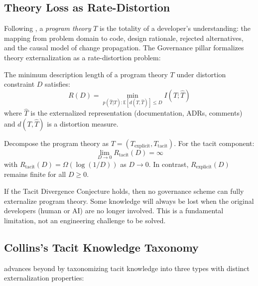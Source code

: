 \subsection{Theory Loss as Rate-Distortion}

Following \citet{naur1985}, a \emph{program theory} $T$ is the totality of a developer's understanding: the mapping from problem domain to code, design rationale, rejected alternatives, and the causal model of change propagation. The Governance pillar formalizes theory externalization as a rate-distortion problem:

\begin{theorem}
\label{thm:theory-loss}
The minimum description length of a program theory $T$ under distortion constraint $D$ satisfies:
\begin{equation}
    R(D) = \min_{p(\hat{T}|T): \mathbb{E}[d(T,\hat{T})] \leq D} I(T; \hat{T})
\end{equation}
where $\hat{T}$ is the externalized representation (documentation, ADRs, comments) and $d(T, \hat{T})$ is a distortion measure.
\end{theorem}

\begin{conjecture}
\label{conj:tacit}
Decompose the program theory as $T = (T_{\mathrm{explicit}}, T_{\mathrm{tacit}})$. For the tacit component:
\begin{equation}
    \lim_{D \to 0} R_{\mathrm{tacit}}(D) = \infty
\end{equation}
with $R_{\mathrm{tacit}}(D) = \Omega(\log(1/D))$ as $D \to 0$. In contrast, $R_{\mathrm{explicit}}(D)$ remains finite for all $D \geq 0$.
\end{conjecture}

If the Tacit Divergence Conjecture holds, then no governance scheme can fully externalize program theory. Some knowledge will always be lost when the original developers (human or AI) are no longer involved. This is a fundamental limitation, not an engineering challenge to be solved.

\subsection{Collins's Tacit Knowledge Taxonomy}

\citet{collins2010} advances beyond \citet{polanyi1966} by taxonomizing tacit knowledge into three types with distinct externalization properties:

